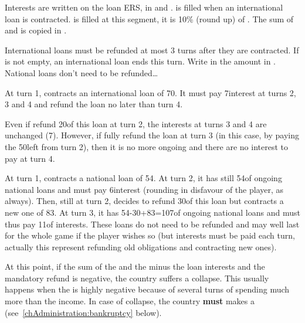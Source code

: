 \aparag Interests are written on the loan ERS, in  and .
\bparag {} is filled when an
international loan is contracted.
\bparag {} is filled at this segment, it
is 10\% (round up) of .
\bparag The sum of  and
 is copied in .

 International loans must be refunded at most 3 turns
after they are contracted. If  is not
empty, an international loan ends this turn. Write in  the amount in .
\bparag National loans don't need to be refunded\ldots

\begin{exemple}
  At turn 1, \POR contracts an international loan of 70\ducats. It must pay
  7\ducats interest at turns 2, 3 and 4 and refund the loan no later than turn
  4.

  Even if \POR refund 20\ducats of this loan at turn 2, the interests at turns
  3 and 4 are unchanged (7\ducats). However, if \POR fully refund the loan at
  turn 3 (in this case, by paying the 50\ducats left from turn 2), then it is
  no more ongoing and there are no interest to pay at turn 4.

  \smallskip

  At turn 1, \FRA contracts a national loan of 54\ducats. At turn 2, it has
  still 54\ducats of ongoing national loans and must pay 6\ducats interest
  (rounding in disfavour of the player, as always). Then, still at turn 2,
  \FRA decides to refund 30\ducats of this loan but contracts a new one of
  83\ducats. At turn 3, it has 54-30+83=107\ducats of ongoing national loans
  and must thus pay 11\ducats of interests. These loans do not need to be
  refunded and may well last for the whole game if the player wishes so (but
  interests must be paid each turn, actually this represent refunding old
  obligations and contracting new ones).
\end{exemple}

 At this point, if the sum of the \RT and the
 minus the loan interests and the mandatory refund is
negative, the country suffers a collapse. This usually happens when the \RT is
highly negative because of several turns of spending much more than the
income.
\bparag In case of collapse, the country \textbf{must} makes a  (see~\ref{chAdministration:bankruptcy} below).



